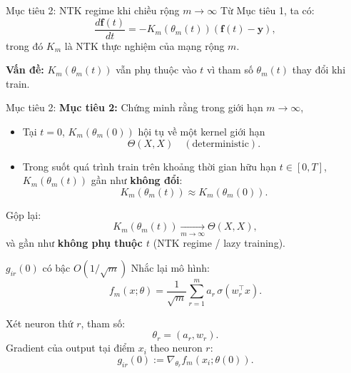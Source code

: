 \documentclass[12pt]{beamer}
\begin{document}
\begin{frame}{Mục tiêu 2: NTK regime khi chiều rộng $m \to \infty$}
  Từ Mục tiêu 1, ta có:
  \[
    \frac{d\mathbf f(t)}{dt}
    = -K_m(\theta_m(t))(\mathbf f(t) - \mathbf y),
  \]
  trong đó $K_m$ là NTK thực nghiệm của mạng rộng $m$.

  \vspace{0.2cm}
  \textbf{Vấn đề:} $K_m(\theta_m(t))$ vẫn phụ thuộc vào $t$
  vì tham số $\theta_m(t)$ thay đổi khi train.

\end{frame}
\begin{frame}{Mục tiêu 2:}
      \textbf{Mục tiêu 2:} Chứng minh rằng trong giới hạn $m \to \infty$,
  \begin{itemize}
    \item Tại $t=0$, $K_m(\theta_m(0))$ hội tụ về một kernel giới hạn
          \[
            \Theta(X,X) \quad (\text{deterministic}).
          \]
    \item Trong suốt quá trình train trên khoảng thời gian hữu hạn $t \in [0,T]$,
          $K_m(\theta_m(t))$ gần như \textbf{không đổi}:
          \[
            K_m(\theta_m(t)) \approx K_m(\theta_m(0)).
          \]
  \end{itemize}

  \vspace{0.2cm}
  Gộp lại:
  \[
    K_m(\theta_m(t))
    \xrightarrow[m\to\infty]{}
    \Theta(X,X),
  \]
  và gần như \textbf{không phụ thuộc $t$} (NTK regime / lazy training).
\end{frame}

\begin{frame}{$g_{ir}(0)$ có bậc $O(1/\sqrt{m})$}
  Nhắc lại mô hình:
  \[
    f_m(x;\theta)
    = \frac{1}{\sqrt{m}} \sum_{r=1}^m a_r\,\sigma(w_r^\top x).
  \]

  Xét neuron thứ $r$, tham số:
  \[
    \theta_r = (a_r, w_r).
  \]
  Gradient của output tại điểm $x_i$ theo neuron $r$:
  \[
    g_{ir}(0) := \nabla_{\theta_r} f_m(x_i; \theta(0)).
  \]
\end{frame}
\end{document}
